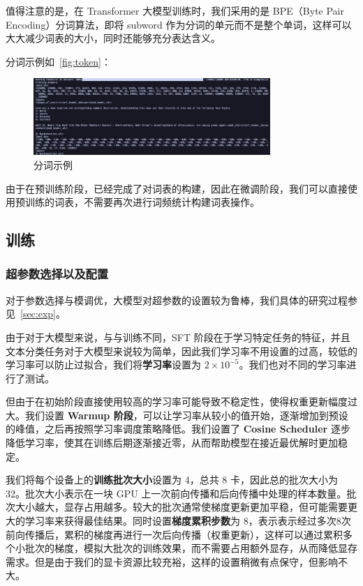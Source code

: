 值得注意的是，在 Transformer 大模型训练时，我们采用的是 BPE（Byte Pair Encoding）分词算法，即将 subword 作为分词的单元而不是整个单词，这样可以大大减少词表的大小，同时还能够充分表达含义。

分词示例如~\autoref{fig:token}：\begin{figure}[htbp]
    \centering
    \includegraphics[width=0.8\textwidth]{images/token.png}
    \caption{分词示例}
    \label{fig:token}
\end{figure}

由于在预训练阶段，已经完成了对词表的构建，因此在微调阶段，我们可以直接使用预训练的词表，不需要再次进行词频统计构建词表操作。

\subsection{训练}

\subsubsection{超参数选择以及配置}

对于参数选择与模调优，大模型对超参数的设置较为鲁棒，我们具体的研究过程参见~\autoref{sec:exp}。

由于对于大模型来说，与与训练不同，SFT 阶段在于学习特定任务的特征，并且文本分类任务对于大模型来说较为简单，因此我们学习率不用设置的过高，较低的学习率可以防止过拟合，我们将\textbf{学习率}设置为 $2\times10^{-5}$。我们也对不同的学习率进行了测试。

但由于在初始阶段直接使用较高的学习率可能导致不稳定性，使得权重更新幅度过大。我们设置 \textbf{Warmup 阶段}，可以让学习率从较小的值开始，逐渐增加到预设的峰值，之后再按照学习率调度策略降低。我们设置了 \textbf{Cosine Scheduler} 逐步降低学习率，使其在训练后期逐渐接近零，从而帮助模型在接近最优解时更加稳定。

我们将每个设备上的\textbf{训练批次大小}设置为 4，总共 8 卡，因此总的批次大小为 32。批次大小表示在一块 GPU 上一次前向传播和后向传播中处理的样本数量。批次大小越大，显存占用越多。较大的批次通常使梯度更新更加平稳，但可能需要更大的学习率来获得最佳结果。同时设置\textbf{梯度累积步数}为 8，表示表示经过多次8次前向传播后，累积的梯度再进行一次后向传播（权重更新），这样可以通过累积多个小批次的梯度，模拟大批次的训练效果，而不需要占用额外显存，从而降低显存需求。但是由于我们的显卡资源比较充裕，这样的设置稍微有点保守，但影响不大。

